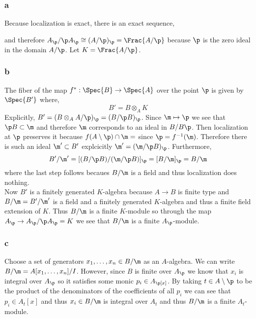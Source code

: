 \documentclass[12pt]{article}
\begin{document}
\subsubsection{a}

Because localization is exact, there is an exact sequence,
\begin{center}
\end{center}
and therefore $A_\p / \p A_\p \cong (A / \p)_\p = \Frac{A/\p}$ because $\p$ is the zero ideal in the domain $A / \p$. Let $K = \Frac{A/\p}$.

\subsubsection{b}

The fiber of the map $f^* : \Spec{B} \to \Spec{A}$ over the point $\p$ is given by $\Spec{B'}$ where,
\[ B' = B \otimes_A K \]
Explicitly, $B' = (B \otimes_A A / \p)_\p = (B / \p B)_\p$. Since $\m \mapsto \p$ we see that $\p B \subset \m$ and therefore $\m$ corresponds to an ideal in $B / B \p$. Then localization at $\p$ preserves it because $f(A \setminus \p) \cap \m = \empty$ since $\p = f^{-1}(\m)$. Therefore there is such an ideal $\m' \subset B'$ explcicitly $\m' = (\m / \p B)_\p$. Furthermore,
\[ B' / \m' = [(B / \p B)/(\m / \p B)]_\p = [B / \m ]_\p = B / \m \]
where the last step follows becaues $B / \m$ is a field and thus localization does nothing.
\bigskip\\
Now $B'$ is a finitely generated $K$-algebra because $A \to B$ is finite type and $B/\m = B'/\m'$ is a field and a finitely generated $K$-algebra and thus a finite field extension of $K$. Thus $B/\m$ is a finite $K$-module so through the map $A_\p \to A_\p / \p A_\p = K$ we see that $B / \m$ is a finite $A_\p$-module.

\subsubsection{c}

Choose a set of generators $x_1, \dots, x_n \in B / \m$ as an $A$-algebra. We can write $B / \m = A[x_1, \dots, x_n]/I$. However, since $B$ is finite over $A_\p$ we know that $x_i$ is integral over $A_\p$ so it satisfies some monic $p_i \in A_\p[x]$. By taking $t \in A \setminus \p$ to be the product of the denominators of the coefficients of all $p_i$ we can see that $p_i \in A_t[x]$ and thus $x_i \in B / \m$ is integral over $A_t$ and thus $B / \m$ is a finite $A_t$-module.
\end{document}
